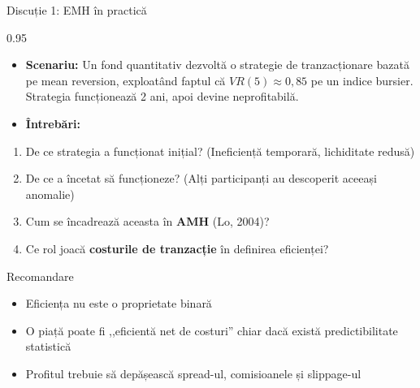 \documentclass[9pt, aspectratio=169, t]{beamer}
\begin{document}
\begin{frame}[shrink=15]{Discuție 1: EMH în practică}
\begin{cminipage}{0.95\textwidth}
\begin{itemize}\setlength{\itemsep}{0pt}
    \item \textbf{Scenariu:} Un fond quantitativ dezvoltă o strategie de tranzacționare bazată pe mean reversion, exploatând faptul că $VR(5) \approx 0{,}85$ pe un indice bursier. Strategia funcționează 2 ani, apoi devine neprofitabilă.
    \item \textbf{Întrebări:}
\end{itemize}
\begin{enumerate}\setlength{\itemsep}{0pt}
    \item De ce strategia a funcționat inițial? (Ineficiență temporară, lichiditate redusă)
    \item De ce a încetat să funcționeze? (Alți participanți au descoperit aceeași anomalie)
    \item Cum se încadrează aceasta în \textbf{AMH} (Lo, 2004)?
    \item Ce rol joacă \textbf{costurile de tranzacție} în definirea eficienței?
\end{enumerate}

\vspace{0.2cm}
\begin{block}{Recomandare}
\small
\begin{itemize}\setlength{\itemsep}{0pt}
    \item Eficiența nu este o proprietate binară
    \item O piață poate fi ,,eficientă net de costuri'' chiar dacă există predictibilitate statistică
    \item Profitul trebuie să depășească spread-ul, comisioanele și slippage-ul
\end{itemize}
\end{block}
\end{cminipage}
\end{frame}
\end{document}
